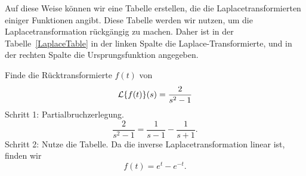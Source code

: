 Auf diese Weise k\"onnen wir eine Tabelle erstellen, die die 
Laplacetransformierten einiger Funktionen angibt. Diese Tabelle
werden wir nutzen, um die Laplacetransformation r\"uckg\"angig
zu machen. Daher ist in der Tabelle~\ref{LaplaceTable} 
in der linken Spalte die Laplace-Transformierte, und in der rechten 
Spalte die Ursprungsfunktion
angegeben.

\begin{table}[htb]
\end{table}

\begin{bspX}
Finde die R\"ucktransformierte $f(t)$ von 
$${\cal L}\{f(t)\}(s) = \frac {2}{s^2-1}
$$
Schritt 1: Partialbruchzerlegung.\\
$$\frac{2}{s^2-1} = \frac 1{s-1} - \frac 1 {s+1}.$$
Schritt 2: Nutze die Tabelle. Da die inverse Laplacetransformation linear ist, finden wir 
$$f(t) = e^{t}-e^{-t}.$$
\end{bspX}

\begin{auf}\chb\label{lpaplaceAuf1}

\end{auf}


\begin{auf}\chc\label{lpaplaceAuf2}

\end{auf}


